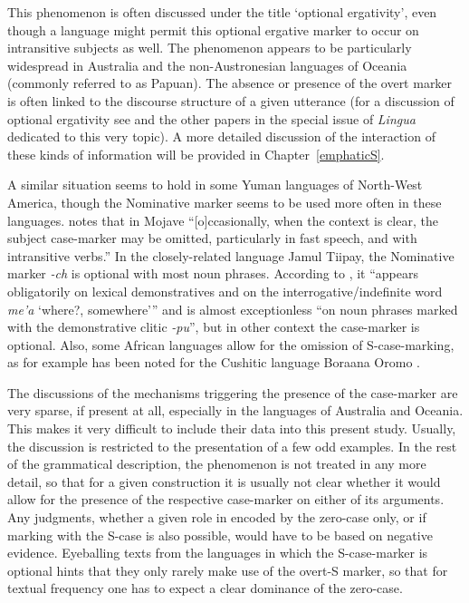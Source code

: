 This phenomenon is often discussed under the title `optional ergativity', even though a language might permit this optional ergative marker to occur on intransitive subjects as well. 
The phenomenon appears to be particularly widespread in Australia and the non-Austronesian languages of Oceania (commonly referred to as Papuan). 
The absence or presence of the overt marker is often linked to the discourse structure of a given utterance (for a discussion of optional ergativity see \cite{OptionalErg} and the other papers in the special issue of \emph{Lingua} dedicated to this very topic). 
A more detailed discussion of the interaction of these kinds of information will be provided in Chapter~\ref{emphaticS}. 

A similar situation seems to hold in some Yuman languages of North-West America, though the Nominative marker seems to be used more often in these languages. 
\citet[19]{Munro:1976} notes that in Mojave ``[o]ccasionally, when the context is clear, the subject case-marker may be omitted, particularly in fast speech, and with intransitive verbs.'' 
In the closely-related language Jamul Tiipay, the Nominative marker \emph{-ch} is optional with most noun phrases. 
According to \citet[160]{Miller:2001}, it ``appears obligatorily on lexical demonstratives and on the interrogative/indefinite word \emph{me'a} `where?, somewhere''' and is almost exceptionless ``on noun phrases marked with the demonstrative clitic \emph{-pu}'', but in other context the case-marker is optional. 
Also, some African languages allow for the omission of S-case-marking, as for example has been noted for the Cushitic language Boraana Oromo \citep[93]{Stroomer:1995}.
   
The discussions of the mechanisms triggering the presence of the case-marker are very sparse, if present at all, especially in the languages of Australia and Oceania. 
This makes it very difficult to include their data into this present study.  
Usually, the discussion is restricted to the presentation of a few odd examples. 
In the rest of the grammatical description, the phenomenon is not treated in any more detail, so that for a given construction it is usually not clear whether it would allow for the presence of the respective case-marker on either of its arguments. 
Any judgments, whether a given role in encoded by the zero-case only, or if marking with the S-case is also possible, would have to be based on negative evidence. 
Eyeballing texts from the languages in which the S-case-marker is optional hints that they only rarely make use of the overt-S marker, so that for textual frequency one has to expect a clear dominance of the zero-case.


